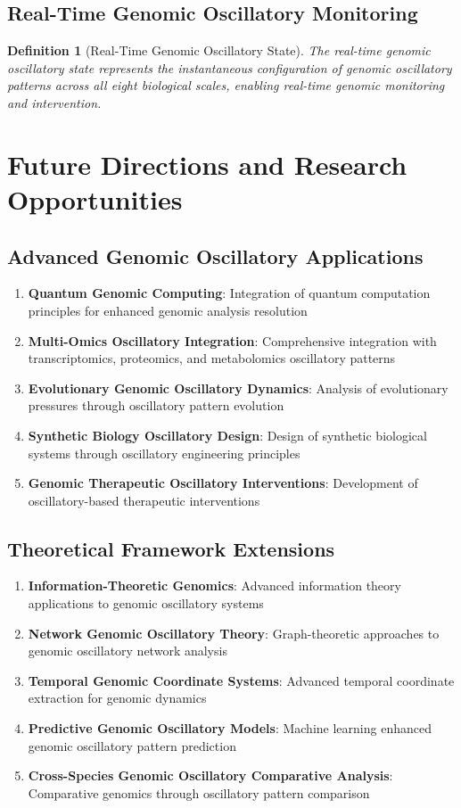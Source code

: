 \documentclass[12pt,a4paper]{article}
\newtheorem{definition}{Definition}
\begin{document}
\subsection{Real-Time Genomic Oscillatory Monitoring}

\begin{definition}[Real-Time Genomic Oscillatory State]
The real-time genomic oscillatory state represents the instantaneous configuration of genomic oscillatory patterns across all eight biological scales, enabling real-time genomic monitoring and intervention.
\end{definition}

\section{Future Directions and Research Opportunities}

\subsection{Advanced Genomic Oscillatory Applications}

\begin{enumerate}
\item \textbf{Quantum Genomic Computing}: Integration of quantum computation principles for enhanced genomic analysis resolution
\item \textbf{Multi-Omics Oscillatory Integration}: Comprehensive integration with transcriptomics, proteomics, and metabolomics oscillatory patterns
\item \textbf{Evolutionary Genomic Oscillatory Dynamics}: Analysis of evolutionary pressures through oscillatory pattern evolution
\item \textbf{Synthetic Biology Oscillatory Design}: Design of synthetic biological systems through oscillatory engineering principles
\item \textbf{Genomic Therapeutic Oscillatory Interventions}: Development of oscillatory-based therapeutic interventions
\end{enumerate}

\subsection{Theoretical Framework Extensions}

\begin{enumerate}
\item \textbf{Information-Theoretic Genomics}: Advanced information theory applications to genomic oscillatory systems
\item \textbf{Network Genomic Oscillatory Theory}: Graph-theoretic approaches to genomic oscillatory network analysis
\item \textbf{Temporal Genomic Coordinate Systems}: Advanced temporal coordinate extraction for genomic dynamics
\item \textbf{Predictive Genomic Oscillatory Models}: Machine learning enhanced genomic oscillatory pattern prediction
\item \textbf{Cross-Species Genomic Oscillatory Comparative Analysis}: Comparative genomics through oscillatory pattern comparison
\end{enumerate}
\end{document}
